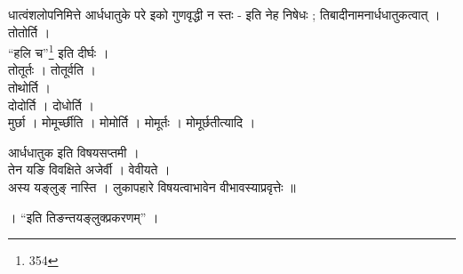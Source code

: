 धात्वंशलोपनिमित्ते आर्धधातुके परे इको गुणवृद्धी न स्तः - इति नेह निषेधः ; तिबादीनामनार्धधातुकत्वात् । \\
तोतोर्ति । \\
``हलि च''\footnote{
  354
}
इति दीर्घः ।\\
तोतूर्तः । तोतूर्वति ।\\
तोथोर्ति । \\
दोदोर्ति । दोधोर्ति । \\
मुर्छा । मोमूर्च्छीति । मोमोर्ति । मोमूर्तः । मोमूर्छतीत्यादि । \par

आर्धधातुक इति विषयसप्तमी । \\
तेन यङि विवक्षिते अजेर्वी । वेवीयते ।\\
अस्य यङ्लुङ् नास्ति । लुकापहारे विषयत्वाभावेन वीभावस्याप्रवृत्तेः ॥ \par

। ``इति तिङन्तयङ्लुक्प्रकरणम्''‌ ।

